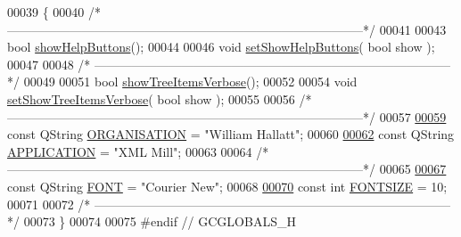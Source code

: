 \begin{DoxyCode}
00039 \{
00040   \textcolor{comment}{/*
      --------------------------------------------------------------------------------------*/}
00041 
00043   \textcolor{keywordtype}{bool} \hyperlink{namespace_g_c_global_space_a981753e55f0f77f981f67ccb1ad4ecf1}{showHelpButtons}();
00044 
00046   \textcolor{keywordtype}{void} \hyperlink{namespace_g_c_global_space_a6395acc08160e411395f96a88793eacc}{setShowHelpButtons}( \textcolor{keywordtype}{bool} show );
00047 
00048   \textcolor{comment}{/*
      --------------------------------------------------------------------------------------*/}
00049 
00051   \textcolor{keywordtype}{bool} \hyperlink{namespace_g_c_global_space_ad9a35f311bda4dd28f5cf155c5efc818}{showTreeItemsVerbose}();
00052 
00054   \textcolor{keywordtype}{void} \hyperlink{namespace_g_c_global_space_a58bc4fea7a061440f9ef2dd0aca8aba5}{setShowTreeItemsVerbose}( \textcolor{keywordtype}{bool} show );
00055 
00056   \textcolor{comment}{/*
      --------------------------------------------------------------------------------------*/}
00057 
\hypertarget{gcglobalspace_8h_source_l00059}{}\hyperlink{namespace_g_c_global_space_a97583835f9987b1c94ff05802ccfe42f}{00059}   \textcolor{keyword}{const} QString \hyperlink{namespace_g_c_global_space_a97583835f9987b1c94ff05802ccfe42f}{ORGANISATION} = \textcolor{stringliteral}{"William Hallatt"};
00060 
\hypertarget{gcglobalspace_8h_source_l00062}{}\hyperlink{namespace_g_c_global_space_ab53b9c3447f00f1cc45a1d3fdfbba564}{00062}   \textcolor{keyword}{const} QString \hyperlink{namespace_g_c_global_space_ab53b9c3447f00f1cc45a1d3fdfbba564}{APPLICATION}  = \textcolor{stringliteral}{"XML Mill"};
00063 
00064   \textcolor{comment}{/*
      --------------------------------------------------------------------------------------*/}
00065 
\hypertarget{gcglobalspace_8h_source_l00067}{}\hyperlink{namespace_g_c_global_space_a9d7158c8a1dfcc867d85ee6b9c5c4810}{00067}   \textcolor{keyword}{const} QString \hyperlink{namespace_g_c_global_space_a9d7158c8a1dfcc867d85ee6b9c5c4810}{FONT} = \textcolor{stringliteral}{"Courier New"};
00068 
\hypertarget{gcglobalspace_8h_source_l00070}{}\hyperlink{namespace_g_c_global_space_ab9fa2f10bab070a4f59b7e3ef9166c86}{00070}   \textcolor{keyword}{const} \textcolor{keywordtype}{int} \hyperlink{namespace_g_c_global_space_ab9fa2f10bab070a4f59b7e3ef9166c86}{FONTSIZE} = 10;
00071 
00072   \textcolor{comment}{/*
      --------------------------------------------------------------------------------------*/}
00073 \}
00074 
00075 \textcolor{preprocessor}{#endif // GCGLOBALS\_H}
\end{DoxyCode}
